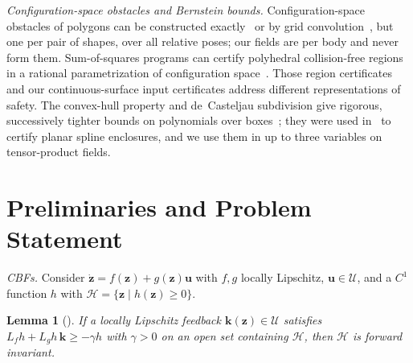 \documentclass[journal]{IEEEtran}
\newtheorem{lemma}{Lemma}
\theoremstyle{definition}
\begin{document}
\emph{Configuration-space obstacles and Bernstein bounds.} Configuration-space obstacles of polygons
can be constructed exactly~\cite{lozanoperez1983spatial,latombe1991robot} or by grid
convolution~\cite{kavraki1995fft}, but one per pair of shapes, over all relative poses; our fields
are per body and never form them. Sum-of-squares programs can certify polyhedral collision-free
regions in a rational parametrization of configuration space~\cite{dai2024certified}.
Those region certificates and our continuous-surface input certificates address different
representations of safety. The
convex-hull property and de~Casteljau subdivision give rigorous, successively tighter bounds on
polynomials over boxes~\cite{farin2002curves,sherbrooke1993computation}; they were used
in~\cite{jo2027semantic} to certify planar spline enclosures, and we use them in up to three
variables on tensor-product fields.

\section{Preliminaries and Problem Statement}\label{sec:prelim}

\emph{CBFs.} Consider $\dot{\mathbf z}=f(\mathbf z)+g(\mathbf z)\mathbf u$ with $f,g$ locally
Lipschitz, $\mathbf u\in\mathcal U$, and a $C^1$ function $h$ with
$\mathcal H=\{\mathbf z\mid h(\mathbf z)\ge0\}$.
\begin{lemma}[\cite{ames2019cbf}]\label{lem:cbf}
If a locally Lipschitz feedback $\mathbf k(\mathbf z)\in\mathcal U$ satisfies
$L_fh+L_gh\,\mathbf k\ge-\gamma h$ with $\gamma>0$ on an open set containing $\mathcal H$, then
$\mathcal H$ is forward invariant.
\end{lemma}
\end{document}
